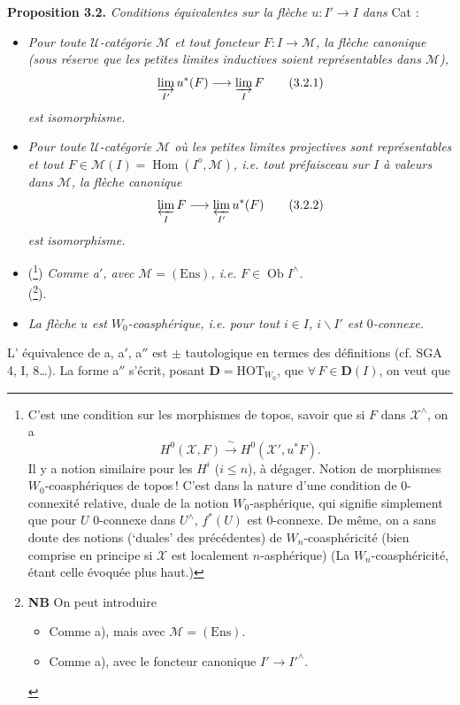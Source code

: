 \documentclass[11pt]{article}
\newcommand{\msp}[1]{\marginpar{\footnotesize [#1]}}
\newcommand{\Hom}{\operatorname{Hom}}
\newcommand{\Ob}{\operatorname{Ob}}
\newcommand{\HOT}{\mathrm{HOT}}
\newcommand{\Ens}{\mathrm{Ens}}
\begin{document}
\noindent\textbf{Proposition 3.2.} \textit{Conditions équivalentes sur la flèche $u : I' \longrightarrow I$ dans} Cat :
\begin{itemize}
\item[a)] \textit{Pour toute $\mathcal{U}$-catégorie $\mathcal{M}$ et tout foncteur $F : I \longrightarrow \mathcal{M}$, la flèche canonique (sous réserve que les petites limites inductives soient représentables dans $\mathcal{M}$),}
\[
\varinjlim_{I'} u^*(F) \longrightarrow \varinjlim_{I} F \tag*{(3.2.1)}
\]
\msp{page 44}
\textit{est} \textit{isomorphisme.}
\item[a$'$)] \textit{Pour toute $\mathcal{U}$-catégorie $\mathcal{M}$ où les petites limites projectives sont représentables et tout $F \in \mathcal{M}(I) = \Hom(I^o,\mathcal{M})$, i.e. tout préfaisceau sur $I$ à valeurs dans $\mathcal{M}$, la flèche canonique}
\[
\varprojlim_{I} F \longrightarrow \varprojlim_{I'} u^*(F) \tag*{(3.2.2)}
\]
\textit{est} \textit{isomorphisme.}
\item[a$''$)] (\footnote[53]{C'est une condition sur les morphismes de topos, savoir que si $F$ dans $\mathcal{X}^{\wedge}$, on a
\[
H^0(\mathcal{X},F) \xrightarrow{\;\sim\;} H^0(\mathcal{X}',u^*F).
\]
Il y a notion similaire pour les $H^i$ ($i \leq n$), à dégager. Notion de morphismes $W_0$-coasphériques de topos\,! C'est dans la nature d'une condition de 0-connexité relative, duale de la notion $W_0$-asphérique, qui signifie simplement que pour $U$ 0-connexe dans $U^{\wedge}$, $f^*(U)$ est 0-connexe. De même, on a sans doute des notions (‘duales’ des précédentes) de $W_n$-coasphéricité (bien comprise en principe si $\mathcal{X}$ est localement $n$-asphérique) (La $W_n$-coasphéricité, étant celle évoquée plus haut.)}) \textit{Comme a$'$, avec $\mathcal{M} = (\Ens)$, i.e. $F \in \Ob I^{\wedge}$.}\\
(\footnote[54]{\textbf{NB} On peut introduire
\begin{itemize}
\item[a$'''$)] Comme a), mais avec $\mathcal{M} = (\Ens)$.
\item[a$^{IV}$)] Comme a), avec le foncteur canonique $I' \longrightarrow I'^{\wedge}$.
\end{itemize}}).
\item[b)] \textit{La flèche $u$ est $W_0$-coasphérique, i.e. pour tout $i \in I$, $i\backslash I'$ est $0$-connexe.}
\end{itemize}
L' équivalence de a, a$'$, a$''$ est $\pm$ tautologique en termes des définitions (cf. SGA 4, I, 8\dots). La forme a$''$ s'écrit, posant $\mathbf{D} = \HOT_{W_0}$, que $\forall\, F \in \mathbf{D}(I)$, on veut que
\end{document}
